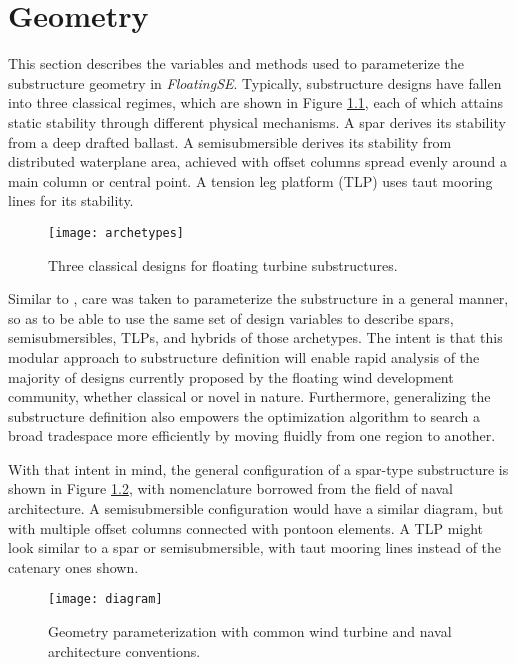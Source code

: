 \chapter{Geometry}
\label{sec:geom}
This section describes the variables and methods used to parameterize
the substructure geometry in \textit{FloatingSE}.  Typically,
substructure designs have fallen into three classical regimes, which are
shown in Figure \ref{fig:archetype}, each of which attains static stability
through different physical mechanisms.  A spar derives its stability from a
deep drafted ballast.  A semisubmersible derives its stability from
distributed waterplane area, achieved with offset columns spread evenly
around a main column or central point.  A tension leg platform (TLP) uses taut
mooring lines for its stability.

\begin{figure}[htbp]
  \begin{center}
    \texttt{[image: archetypes]}
    \caption{Three classical designs for floating turbine substructures.}
    \label{fig:archetype}
  \end{center}
\end{figure}

Similar to \citet{karimi2017}, care was taken to parameterize the
substructure in a general manner, so as to be able to use the same set
of design variables to describe spars, semisubmersibles, TLPs, and
hybrids of those archetypes.  The intent is that this modular approach
to substructure definition will enable rapid analysis of the majority of
designs currently proposed by the floating wind development community,
whether classical or novel in nature.  Furthermore, generalizing the
substructure definition also empowers the optimization algorithm to
search a broad tradespace more efficiently by moving fluidly from one
region to another.

With that intent in mind, the general configuration of a spar-type
substructure is shown in Figure \ref{fig:diagram}, with nomenclature
borrowed from the field of naval architecture.  A semisubmersible
configuration would have a similar diagram, but with multiple offset
columns connected with pontoon elements.  A TLP might look similar to a
spar or semisubmersible, with taut mooring lines instead of the catenary
ones shown.

\begin{figure}[htb]
  \begin{center}
    \texttt{[image: diagram]}
    \caption{Geometry parameterization with common wind turbine and
      naval architecture conventions.}
    \label{fig:diagram}
  \end{center}
\end{figure}

